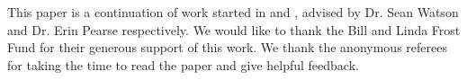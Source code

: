 \documentclass{article}
\theoremstyle{plain}
\numberwithin{equation}{section}
\numberwithin{table}{section}
\numberwithin{figure}{section}
\begin{document}










\begin{ack}
This paper is a continuation of work started in \cite{summerresearch} and \cite{mastersthesis}, advised by Dr. Sean Watson and Dr. Erin Pearse respectively. We would like to thank the Bill and Linda Frost Fund for their generous support of this work. We thank the anonymous referees for taking the time to read the paper and give helpful feedback.
\end{ack}


\end{document}
